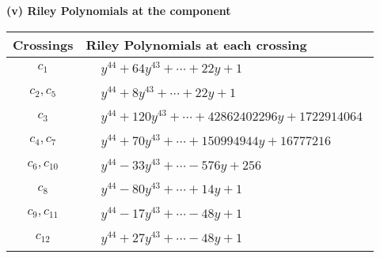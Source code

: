\documentclass[1p]{elsarticle_modified}
\theoremstyle{definition}
\begin{document}
\newpage\renewcommand{\arraystretch}{1}
\flushleft \textbf{(v) Riley Polynomials at the component}\newline \\
\begin{tabular}{m{50pt}|m{274pt}}
Crossings & \hspace{64pt}Riley Polynomials at each crossing \\
\hline $$\begin{aligned}c_{1}\end{aligned}$$&$\begin{aligned}
&y^{44}+64 y^{43}+\cdots+22 y+1
\end{aligned}$\\
\hline $$\begin{aligned}c_{2},c_{5}\end{aligned}$$&$\begin{aligned}
&y^{44}+8 y^{43}+\cdots+22 y+1
\end{aligned}$\\
\hline $$\begin{aligned}c_{3}\end{aligned}$$&$\begin{aligned}
&y^{44}+120 y^{43}+\cdots+42862402296 y+1722914064
\end{aligned}$\\
\hline $$\begin{aligned}c_{4},c_{7}\end{aligned}$$&$\begin{aligned}
&y^{44}+70 y^{43}+\cdots+150994944 y+16777216
\end{aligned}$\\
\hline $$\begin{aligned}c_{6},c_{10}\end{aligned}$$&$\begin{aligned}
&y^{44}-33 y^{43}+\cdots-576 y+256
\end{aligned}$\\
\hline $$\begin{aligned}c_{8}\end{aligned}$$&$\begin{aligned}
&y^{44}-80 y^{43}+\cdots+14 y+1
\end{aligned}$\\
\hline $$\begin{aligned}c_{9},c_{11}\end{aligned}$$&$\begin{aligned}
&y^{44}-17 y^{43}+\cdots-48 y+1
\end{aligned}$\\
\hline $$\begin{aligned}c_{12}\end{aligned}$$&$\begin{aligned}
&y^{44}+27 y^{43}+\cdots-48 y+1
\end{aligned}$\\
\hline
\end{tabular}\\~\\
\end{document}
